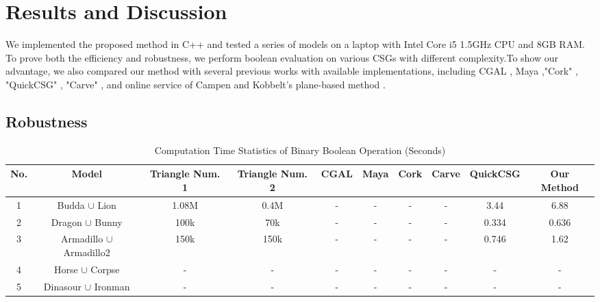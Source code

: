 \documentclass[10pt,journal,compsoc]{IEEEtran}
\begin{document}
\fi

\section{Results and Discussion}

We implemented the proposed method in C++ and tested a series of models on a laptop with Intel Core i5 1.5GHz CPU and 8GB RAM. To prove both the efficiency and robustness, we perform boolean evaluation on various CSGs with different complexity.To show our advantage, we also compared our method with several previous works with available implementations, including CGAL \cite{cgal:hk-bonp3-15a}, Maya \cite{Maya2015,barki2015exact},"Cork" \cite{Cork}, "QuickCSG" \cite{douze2015quickcsg}, "Carve" \cite{Carve}, and online service of Campen and Kobbelt's plane-based method \cite{campen2010exact,WebBSP}.


\subsection{Robustness}

\begin{table}[ht]
\caption{Computation Time Statistics of Binary Boolean Operation (Seconds)}
\label{tab:performance}
\centering
\begin{tabular}{*{9}{c|}c}%
\hline
{No.} & {Model} & {Triangle Num. 1} & {Triangle Num. 2} &
CGAL & Maya & Cork & Carve & QuickCSG & Our Method
\\
\hline\hline
1 & Budda $\cup$ Lion & 1.08M & 0.4M & - & - & - & - & 3.44 & 6.88\\
2 & Dragon $\cup$ Bunny & 100k & 70k & - & - & - & - & 0.334 & 0.636 \\
3 & Armadillo $\cup$ Armadillo2 & 150k & 150k & - & - & - & - & 0.746 & 1.62\\
4 & Horse $\cup$ Corpse & - & - & - & - & - & - & - & -\\
5 & Dinasour $\cup$ Ironman & - & - & - & - & - & - & - & -\\
\hline
\end{tabular}
\begin{flushleft}

\end{flushleft}
\end{table}
\end{document}
